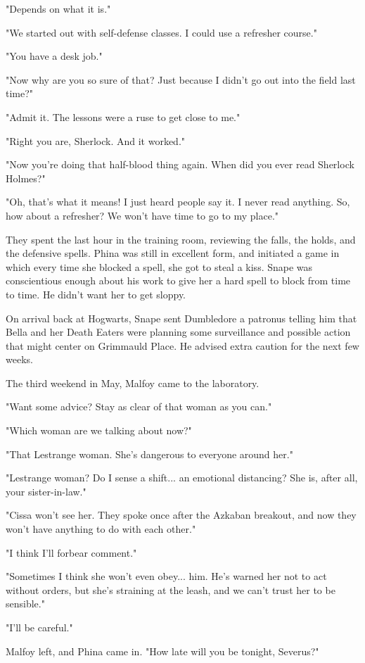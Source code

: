 \documentclass[a4paper,11pt]{article}
\begin{document}
"Depends on what it is."

"We started out with self-defense classes. I could use a refresher course."

"You have a desk job."

"Now why are you so sure of that? Just because I didn't go out into the field last time?"

"Admit it. The lessons were a ruse to get close to me."

"Right you are, Sherlock. And it worked."

"Now you're doing that half-blood thing again. When did you ever read Sherlock Holmes?"

"Oh, that's what it means! I just heard people say it. I never read anything. So, how about a refresher? We won't have time to go to my place."

They spent the last hour in the training room, reviewing the falls, the holds, and the defensive spells. Phina was still in excellent form, and initiated a game in which every time she blocked a spell, she got to steal a kiss. Snape was conscientious enough about his work to give her a hard spell to block from time to time. He didn't want her to get sloppy.

On arrival back at Hogwarts, Snape sent Dumbledore a patronus telling him that Bella and her Death Eaters were planning some surveillance and possible action that might center on Grimmauld Place. He advised extra caution for the next few weeks.

The third weekend in May, Malfoy came to the laboratory.

"Want some advice? Stay as clear of that woman as you can."

"Which woman are we talking about now?"

"That Lestrange woman. She's dangerous to everyone around her."

"Lestrange woman? Do I sense a shift... an emotional distancing? She is, after all, your sister-in-law."

"Cissa won't see her. They spoke once after the Azkaban breakout, and now they won't have anything to do with each other."

"I think I'll forbear comment."

"Sometimes I think she won't even obey... him. He's warned her not to act without orders, but she's straining at the leash, and we can't trust her to be sensible."

"I'll be careful."

Malfoy left, and Phina came in. "How late will you be tonight, Severus?"
\end{document}
